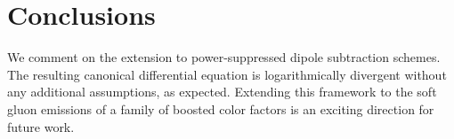 \section{Conclusions}\label{sec:conclusions}

We comment on the extension to power-suppressed dipole subtraction
schemes. The resulting canonical differential equation is
logarithmically divergent without any additional assumptions, as
expected. Extending this framework to the soft gluon emissions of a
family of boosted color factors is an exciting direction for future
work.

